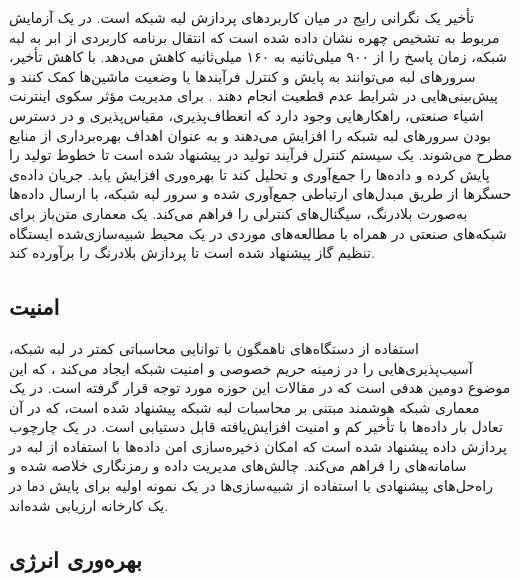 تأخیر یک نگرانی رایج در میان کاربردهای پردازش لبه شبکه است. در یک آزمایش مربوط به تشخیص چهره \cite{yi2015fog} نشان داده شده است که انتقال برنامه کاربردی از ابر به لبه شبکه، زمان پاسخ را از ۹۰۰ میلی‌ثانیه به ۱۶۰ میلی‌ثانیه کاهش می‌دهد. با کاهش تأخیر، سرورهای لبه می‌توانند به پایش و کنترل فرآیندها \cite{li2018deep} یا وضعیت ماشین‌ها \cite{bose2019adepos} کمک کنند و پیش‌بینی‌هایی در شرایط عدم قطعیت انجام دهند \cite{taik2020electrical}. برای مدیریت مؤثر سکوی اینترنت اشیاء صنعتی، راهکارهایی وجود دارد که انعطاف‌پذیری، مقیاس‌پذیری و در دسترس بودن سرورهای لبه شبکه را افزایش می‌دهند و به عنوان اهداف بهره‌برداری از منابع مطرح می‌شوند. یک سیستم کنترل فرآیند تولید در \cite{wu2017fog} پیشنهاد شده است تا خطوط تولید را پایش کرده و داده‌ها را جمع‌آوری و تحلیل کند تا بهره‌وری افزایش یابد. جریان داده‌ی حسگرها از طریق مبدل‌های ارتباطی جمع‌آوری شده و سرور لبه شبکه، با ارسال داده‌ها به‌صورت بلادرنگ، سیگنال‌های کنترلی را فراهم می‌کند. یک معماری متن‌باز برای شبکه‌های صنعتی در \cite{vakili2019open} همراه با مطالعه‌های موردی در یک محیط شبیه‌سازی‌شده ایستگاه تنظیم گاز پیشنهاد شده است تا پردازش بلادرنگ را برآورده کند.

\subsection{امنیت}

استفاده از دستگاه‌های ناهمگون با توانایی محاسباتی کمتر در لبه شبکه، آسیب‌پذیری‌هایی را در زمینه حریم خصوصی و امنیت شبکه ایجاد می‌کند \cite{wu2021blockchain}، که این موضوع دومین هدفی است که در مقالات این حوزه مورد توجه قرار گرفته است. در \cite{chekired2018industrial} یک معماری شبکه هوشمند مبتنی بر محاسبات لبه شبکه پیشنهاد شده است، که در آن تعادل بار داده‌ها با تأخیر کم و امنیت افزایش‌یافته قابل دستیابی است. در \cite{fu2018secure} یک چارچوب پردازش داده پیشنهاد شده است که امکان ذخیره‌سازی امن داده‌ها با استفاده از لبه در سامانه‌های  را فراهم می‌کند. چالش‌های مدیریت داده و رمزنگاری خلاصه شده و راه‌حل‌های پیشنهادی با استفاده از شبیه‌سازی‌ها در یک نمونه اولیه برای پایش دما در یک کارخانه ارزیابی شده‌اند.

\subsection{بهره‌وری انرژی}

